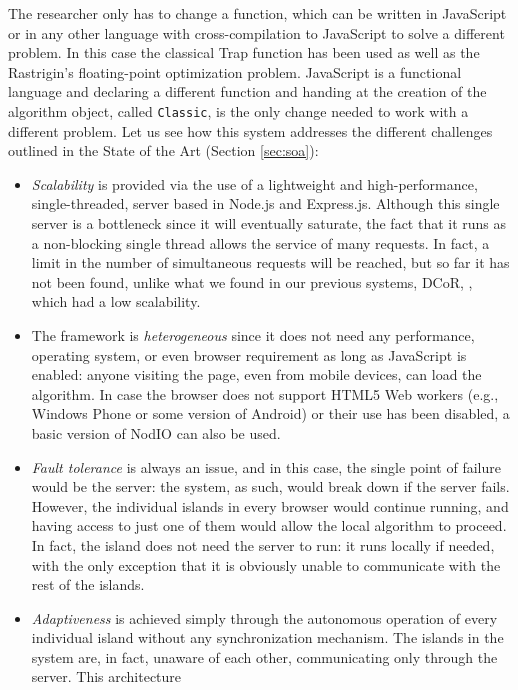\documentclass[journal,onecolumn]{IEEEtran}
\begin{document}
The researcher only has to change a function, which can be written in
JavaScript or in any other language with cross-compilation to
JavaScript \cite{web:compilersjs} to solve a different
problem. In this case the classical Trap function \cite{Ackley1987} has been
used as well as the Rastrigin's floating-point optimization
problem. JavaScript is a functional language and declaring a different 
function and handing at the creation of the algorithm object, called
{\tt Classic}, is the only change needed to work with a different
problem. Let us see how this system addresses the different challenges
outlined in the State of the Art (Section \ref{sec:soa}):
\begin{itemize}
\item {\em Scalability} is provided via the use of a lightweight and
  high-performance, single-threaded, server based in Node.js and
  Express.js. Although this single server is a bottleneck since it
  will eventually saturate, the fact that it runs as a non-blocking single thread
  allows the service of many requests. In fact, a limit in the
  number of simultaneous requests will be reached, but so far it has
  not been found, unlike what we found in our previous systems, DCoR,
  \cite{gecco07:workshop:dcor}, which had a low scalability. 
\item The framework is {\em heterogeneous} since it does not need any
  performance, operating system, or even browser requirement as long
  as JavaScript is enabled: anyone
  visiting the page, even from mobile devices, can load the algorithm.
  In case the browser does not support HTML5 Web workers (e.g., 
  Windows Phone or some version of Android) or their use
  has been disabled, a basic version of {\sf NodIO} can also be used.
\item {\em Fault tolerance} is always an issue, and in this case, the
  single point of failure would be the server: the system, as such,
  would break down if the server fails. However, the individual
  islands in every browser would continue running, and having access
  to just one of them would allow the local algorithm to proceed. In
  fact, the island does not need the server to run: it runs locally if
  needed, with the only exception that it is obviously unable to
  communicate with the rest of the islands.
\item {\em Adaptiveness} is achieved simply through the autonomous
  operation of every individual island without any synchronization
  mechanism. The islands in the system are, in fact, unaware of each
  other, communicating only through the server. This architecture 

\end{itemize}
\end{document}

